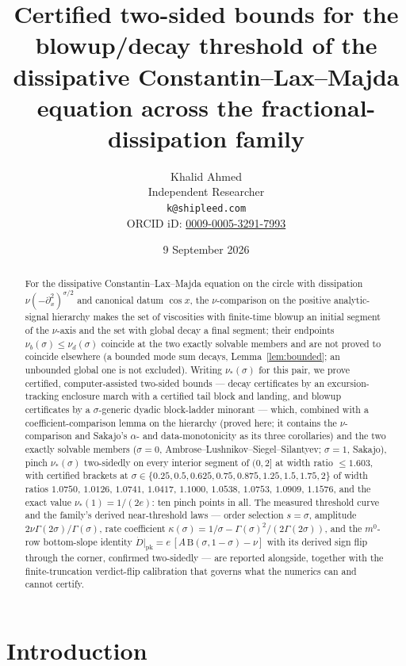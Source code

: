 \documentclass[11pt,a4paper]{article}
\title{Certified two-sided bounds for the blowup/decay threshold of the dissipative Constantin--Lax--Majda equation across the fractional-dissipation family}
\author{Khalid Ahmed\\[2pt]
\small Independent Researcher\\
\small \texttt{k@shipleed.com}\\
\small ORCID iD: \href{https://orcid.org/0009-0005-3291-7993}{0009-0005-3291-7993}}
\date{9 September 2026}
\theoremstyle{plain}
\theoremstyle{definition}
\newcommand{\Bfun}{\mathrm{B}}
\newcommand{\pk}{\mathrm{pk}}
\begin{document}
\maketitle

\begin{abstract}
For the dissipative Constantin--Lax--Majda equation on the circle with dissipation $\nu(-\partial_x^2)^{\sigma/2}$ and canonical datum $\cos x$, the $\nu$-comparison on the positive analytic-signal hierarchy makes the set of viscosities with finite-time blowup an initial segment of the $\nu$-axis and the set with global decay a final segment; their endpoints $\nu_b(\sigma)\le\nu_d(\sigma)$ coincide at the two exactly solvable members and are not proved to coincide elsewhere (a bounded mode sum decays, Lemma~\ref{lem:bounded}; an unbounded global one is not excluded). Writing $\nu_*(\sigma)$ for this pair, we prove certified, computer-assisted two-sided bounds --- decay certificates by an excursion-tracking enclosure march with a certified tail block and landing, and blowup certificates by a $\sigma$-generic dyadic block-ladder minorant --- which, combined with a coefficient-comparison lemma on the hierarchy (proved here; it contains the $\nu$-comparison and Sakajo's $\alpha$- and data-monotonicity as its three corollaries) and the two exactly solvable members ($\sigma=0$, Ambrose--Lushnikov--Siegel--Silantyev; $\sigma=1$, Sakajo), pinch $\nu_*(\sigma)$ two-sidedly on every interior segment of $(0,2]$ at width ratio $\le1.603$, with certified brackets at $\sigma\in\{0.25,0.5,0.625,0.75,0.875,1.25,1.5,1.75,2\}$ of width ratios $1.0750$, $1.0126$, $1.0741$, $1.0417$, $1.1000$, $1.0538$, $1.0753$, $1.0909$, $1.1576$, and the exact value $\nu_*(1)=1/(2e)$: ten pinch points in all. The measured threshold curve and the family's derived near-threshold laws --- order selection $s=\sigma$, amplitude $2\nu\Gamma(2\sigma)/\Gamma(\sigma)$, rate coefficient $\kappa(\sigma)=1/\sigma-\Gamma(\sigma)^2/(2\Gamma(2\sigma))$, and the $m^0$-row bottom-slope identity $\dot D|_{\pk}=e\,[A\,\Bfun(\sigma,1-\sigma)-\nu]$ with its derived sign flip through the corner, confirmed two-sidedly --- are reported alongside, together with the finite-truncation verdict-flip calibration that governs what the numerics can and cannot certify.
\end{abstract}

\section{Introduction}\label{sec:intro}
\end{document}
